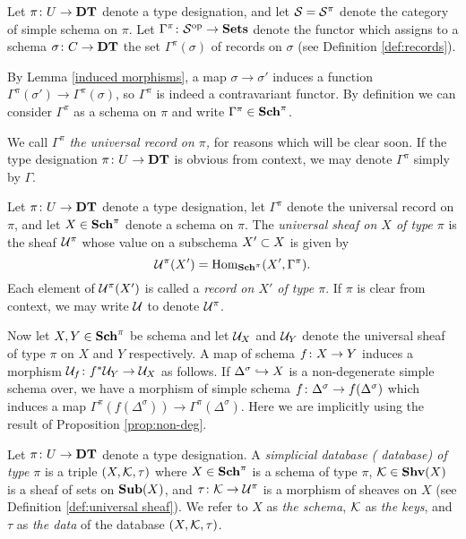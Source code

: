 \documentclass{amsart}
\def\DT{{\bf DT}}
\def\Sch{{\bf Sch}}
\def\Sub{{\bf Sub}}
\begin{document}
\begin{example}\label{ex:universal record}

Let $\pi\taking U\to\DT$ denote a type designation, and let $\mcS=\mcS^\pi$ denote the category of simple schema on $\pi$.  Let $\Gamma^\pi\taking\mcS\op\to\Sets$ denote the functor which assigns to a schema $\sigma\taking C\to\DT$ the set $\Gamma^\pi(\sigma)$ of records on $\sigma$ (see Definition \ref{def:records}).

By Lemma \ref{induced morphisms}, a map $\sigma\to\sigma'$ induces a function $\Gamma^\pi(\sigma')\to\Gamma^\pi(\sigma)$, so $\Gamma^\pi$ is indeed a contravariant functor.  By definition we can consider $\Gamma^\pi$ as a schema on $\pi$ and write $\Gamma^\pi\in\Sch^\pi$.

We call $\Gamma^\pi$ {\em the universal record on $\pi$,} for reasons which will be clear soon.  If the type designation $\pi\taking U\to\DT$ is obvious from context, we may denote $\Gamma^\pi$ simply by $\Gamma$.  

\end{example}


\begin{definition}\label{def:universal sheaf}

Let $\pi\taking U\to\DT$ denote a type designation, let $\Gamma^\pi$ denote the universal record on $\pi$, and let $X\in\Sch^\pi$ denote a schema on $\pi$.  The {\em universal sheaf on $X$ of type $\pi$} is the sheaf $\mcU^\pi$ whose value on a subschema $X'\ss X$ is given by $$\mcU^\pi(X')=\Hom_{\Sch^\pi}(X',\Gamma^\pi).$$  Each element of $\mcU^\pi(X')$ is called a {\em record on $X'$ of type $\pi$}.  If $\pi$ is clear from context, we may write $\mcU$ to denote $\mcU^\pi$.

Now let $X,Y\in\Sch^\pi$ be schema and let $\mcU_X$ and $\mcU_Y$ denote the universal sheaf of type $\pi$ on $X$ and $Y$ respectively.  A map of schema $f\taking X\to Y$ induces a morphism $\mcU_f\taking f^*\mcU_Y\to\mcU_X$ as follows.  If $\Delta^\sigma\inj X$ is a non-degenerate simple schema over, we have a morphism of simple schema $f\taking \Delta^\sigma\to f(\Delta^\sigma)$ which induces a map $\Gamma^\pi(f(\Delta^\sigma))\to\Gamma^\pi(\Delta^\sigma)$.  Here we are implicitly using the result of Proposition \ref{prop:non-deg}.

\end{definition}

\begin{definition}\label{def:database objects}

Let $\pi\taking U\to\DT$ denote a type designation.  A {\em simplicial database ( database) of type $\pi$} is a triple $(X,\mcK,\tau)$ where $X\in\Sch^\pi$ is a schema of type $\pi$, $\mcK\in\Shv(X)$ is a sheaf of sets on $\Sub(X)$, and $\tau\taking\mcK\to\mcU^\pi$ is a morphism of sheaves on $X$ (see Definition \ref{def:universal sheaf}).  We refer to $X$ as {\em the schema}, $\mcK$ as {\em the keys}, and $\tau$ as {\em the data} of the database $(X,\mcK,\tau)$.

\end{definition}
\end{document}
